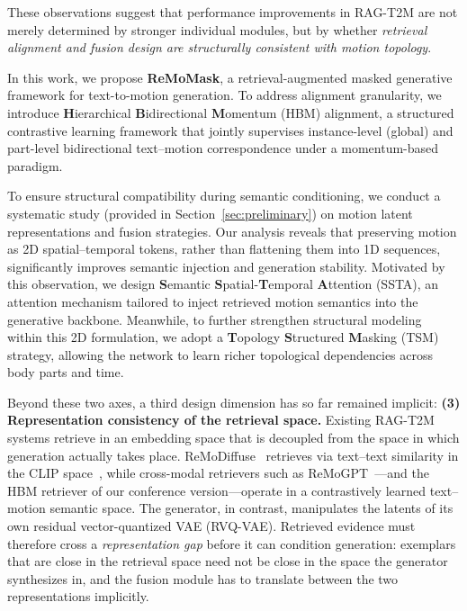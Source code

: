 \documentclass[10pt,journal,compsoc]{IEEEtran}
\begin{document}
These observations suggest that performance improvements in RAG-T2M are not merely determined by stronger individual modules, but by whether \emph{retrieval alignment and fusion design are structurally consistent with motion topology}.

In this work, we propose \textbf{ReMoMask}, a retrieval-augmented masked generative framework for text-to-motion generation. 
To address alignment granularity, we introduce \textbf{H}ierarchical \textbf{B}idirectional \textbf{M}omentum (HBM) alignment, a structured contrastive learning framework that jointly supervises instance-level (global) and part-level bidirectional text–motion correspondence under a momentum-based paradigm. 

To ensure structural compatibility during semantic conditioning, we conduct a systematic study (provided in Section~\ref{sec:preliminary}) on motion latent representations and fusion strategies. 
Our analysis reveals that preserving motion as 2D spatial–temporal tokens, rather than flattening them into 1D sequences, significantly improves semantic injection and generation stability. 
Motivated by this observation, we design \textbf{S}emantic \textbf{S}patial-\textbf{T}emporal \textbf{A}ttention (SSTA), an attention mechanism tailored to inject retrieved motion semantics into the generative backbone. Meanwhile, to further strengthen structural modeling within this 2D formulation, we adopt a \textbf{T}opology \textbf{S}tructured \textbf{M}asking (TSM) strategy, allowing the network to learn richer topological dependencies across body parts and time.

Beyond these two axes, a third design dimension has so far remained implicit: \textbf{(3) Representation consistency of the retrieval space.} Existing RAG-T2M systems retrieve in an embedding space that is decoupled from the space in which generation actually takes place. ReMoDiffuse~\cite{remodiffuse} retrieves via text--text similarity in the CLIP space~\cite{clip}, while cross-modal retrievers such as ReMoGPT~\cite{remogpt}---and the HBM retriever of our conference version---operate in a contrastively learned text--motion semantic space. The generator, in contrast, manipulates the latents of its own residual vector-quantized VAE (RVQ-VAE). Retrieved evidence must therefore cross a \emph{representation gap} before it can condition generation: exemplars that are close in the retrieval space need not be close in the space the generator synthesizes in, and the fusion module has to translate between the two representations implicitly.
\end{document}
